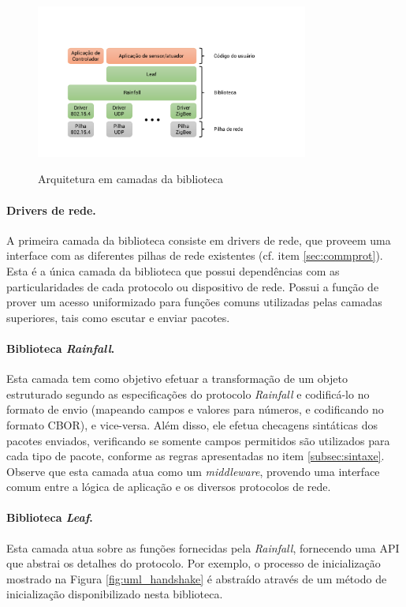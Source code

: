 \begin{figure}[h]
	\centering
	\caption{Arquitetura em camadas da biblioteca}
	\includegraphics[width=0.8\textwidth]{imagens/libarchitecture.pdf}
 	\label{fig:libarchitecture}
\end{figure}

\paragraph*{Drivers de rede.} A primeira camada da biblioteca consiste em drivers de rede, que proveem uma interface com as diferentes pilhas de rede existentes (cf. item \ref{sec:commprot}). Esta é a única camada da biblioteca que possui dependências com as particularidades de cada protocolo ou dispositivo de rede. Possui a função de prover um acesso uniformizado para funções comuns utilizadas pelas camadas superiores, tais como escutar e enviar pacotes.

\paragraph*{Biblioteca \textit{Rainfall}.} Esta camada tem como objetivo efetuar a transformação de um objeto estruturado segundo as especificações do protocolo \textit{Rainfall} e codificá-lo no formato de envio (mapeando campos e valores para números, e codificando no formato CBOR), e vice-versa. Além disso, ele efetua checagens sintáticas dos pacotes enviados, verificando se somente campos permitidos são utilizados para cada tipo de pacote, conforme as regras apresentadas no item \ref{subsec:sintaxe}. Observe que esta camada atua como um \textit{middleware}, provendo uma interface comum entre a lógica de aplicação e os diversos protocolos de rede.

\paragraph*{Biblioteca \textit{Leaf}.} Esta camada atua sobre as funções fornecidas pela \textit{Rainfall}, fornecendo uma API que abstrai os detalhes do protocolo. Por exemplo, o processo de inicialização mostrado na Figura \ref{fig:uml_handshake} é abstraído através de um método de inicialização disponibilizado nesta biblioteca.

